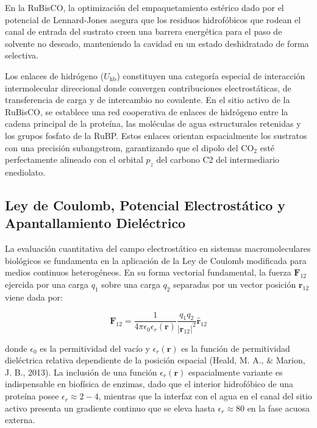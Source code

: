 \documentclass[12pt]{article}
\begin{document}
En la RuBisCO, la optimización del empaquetamiento estérico dado por el potencial de Lennard-Jones asegura que los residuos hidrofóbicos que rodean el canal de entrada del sustrato creen una barrera energética para el paso de solvente no deseado, manteniendo la cavidad en un estado deshidratado de forma selectiva.

Los enlaces de hidrógeno ($U_{\text{hb}}$) constituyen una categoría especial de interacción intermolecular direccional donde convergen contribuciones electrostáticas, de transferencia de carga y de intercambio no covalente. En el sitio activo de la RuBisCO, se establece una red cooperativa de enlaces de hidrógeno entre la cadena principal de la proteína, las moléculas de agua estructurales retenidas y los grupos fosfato de la RuBP. Estos enlaces orientan espacialmente los sustratos con una precisión subangstrom, garantizando que el dipolo del $\text{CO}_2$ esté perfectamente alineado con el orbital $p_z$ del carbono C2 del intermediario enediolato.

\subsection{Ley de Coulomb, Potencial Electrostático y Apantallamiento Dieléctrico}

La evaluación cuantitativa del campo electrostático en sistemas macromoleculares biológicos se fundamenta en la aplicación de la Ley de Coulomb modificada para medios continuos heterogéneos. En su forma vectorial fundamental, la fuerza $\mathbf{F}_{12}$ ejercida por una carga $q_1$ sobre una carga $q_2$ separadas por un vector posición $\mathbf{r}_{12}$ viene dada por:

\begin{equation}
\mathbf{F}_{12} = \frac{1}{4 \pi \epsilon_0 \epsilon_r(\mathbf{r})} \frac{q_1 q_2}{|\mathbf{r}_{12}|^2} \hat{\mathbf{r}}_{12}
\end{equation}

donde $\epsilon_0$ es la permitividad del vacío y $\epsilon_r(\mathbf{r})$ es la función de permitividad dieléctrica relativa dependiente de la posición espacial (Heald, M. A., \& Marion, J. B., 2013). La inclusión de una función $\epsilon_r(\mathbf{r})$ espacialmente variante es indispensable en biofísica de enzimas, dado que el interior hidrofóbico de una proteína posee $\epsilon_r \approx 2 - 4$, mientras que la interfaz con el agua en el canal del sitio activo presenta un gradiente continuo que se eleva hasta $\epsilon_r \approx 80$ en la fase acuosa externa.
\end{document}
